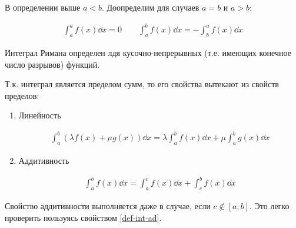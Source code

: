 \begin{remark}\label{def-int-ad}
  В определении выше \(a < b\). Доопределим для случаев \(a = b\) и \(a > b\):

  \begin{align*}
    \int_{a}^{a} f(x) \dd x = 0 \qquad
    \int_{a}^{b} f(x) \dd x = -\int_{b}^{a} f(x) \dd x
  \end{align*}
\end{remark}

\begin{remark}
  Интеграл Римана определен лдя кусочно-непрерывных (т.е. имеющих конечное
  число разрывов) функций.
\end{remark}

Т.к. интеграл является пределом сумм, то его свойства вытекают из свойств
пределов:
\begin{enumerate}
  \item Линейность
  
  \begin{align*}
    \int_{a}^{b} (\lambda f(x) + \mu g(x)) \dd x =
    \lambda \int_{a}^{b} f(x) \dd x + \mu \int_{a}^{b} g(x) \dd x
  \end{align*}

  \item Аддитивность
  
  \begin{align*}
    \int_{a}^{b} f(x) \dd x =
    \int_{a}^{c} f(x) \dd x + \int_{c}^{b} f(x) \dd x
  \end{align*}
\end{enumerate}

\begin{remark}
  Свойство аддитивности выполняется даже в случае, если \(c \notin [a;b]\). Это
  легко проверить пользуясь свойством \ref{def-int-ad}.
\end{remark}